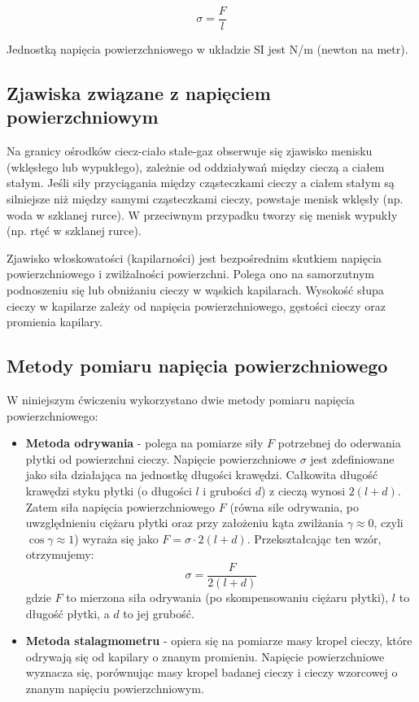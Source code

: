 \documentclass[a4paper,12pt]{article}
\begin{document}
\begin{equation}
    \sigma = \frac{F}{l}
\end{equation}

Jednostką napięcia powierzchniowego w układzie SI jest N/m (newton na metr).

\subsection{Zjawiska związane z napięciem powierzchniowym}

Na granicy ośrodków ciecz-ciało stałe-gaz obserwuje się zjawisko menisku (wklęsłego lub wypukłego), zależnie od oddziaływań między cieczą a ciałem stałym. Jeśli siły przyciągania między cząsteczkami cieczy a ciałem stałym są silniejsze niż między samymi cząsteczkami cieczy, powstaje menisk wklęsły (np. woda w szklanej rurce). W przeciwnym przypadku tworzy się menisk wypukły (np. rtęć w szklanej rurce).

Zjawisko włoskowatości (kapilarności) jest bezpośrednim skutkiem napięcia powierzchniowego i zwilżalności powierzchni. Polega ono na samorzutnym podnoszeniu się lub obniżaniu cieczy w wąskich kapilarach. Wysokość słupa cieczy w kapilarze zależy od napięcia powierzchniowego, gęstości cieczy oraz promienia kapilary.

\subsection{Metody pomiaru napięcia powierzchniowego}

W niniejszym ćwiczeniu wykorzystano dwie metody pomiaru napięcia powierzchniowego:

\begin{itemize}
    \item \textbf{Metoda odrywania} - polega na pomiarze siły $F$ potrzebnej do oderwania płytki od powierzchni cieczy. Napięcie powierzchniowe $\sigma$ jest zdefiniowane jako siła działająca na jednostkę długości krawędzi. Całkowita długość krawędzi styku płytki (o długości $l$ i grubości $d$) z cieczą wynosi $2(l+d)$. Zatem siła napięcia powierzchniowego $F$ (równa sile odrywania, po uwzględnieniu ciężaru płytki oraz przy założeniu kąta zwilżania $\gamma \approx 0$, czyli $\cos\gamma \approx 1$) wyraża się jako $F = \sigma \cdot 2(l+d)$. Przekształcając ten wzór, otrzymujemy:
          \begin{equation}
              \sigma = \frac{F}{2(l+d)} \label{eq:odrywanie}
          \end{equation}
          gdzie $F$ to mierzona siła odrywania (po skompensowaniu ciężaru płytki), $l$ to długość płytki, a $d$ to jej grubość.

    \item \textbf{Metoda stalagmometru} - opiera się na pomiarze masy kropel cieczy, które odrywają się od kapilary o znanym promieniu. Napięcie powierzchniowe wyznacza się, porównując masy kropel badanej cieczy i cieczy wzorcowej o znanym napięciu powierzchniowym.
\end{itemize}
\end{document}
